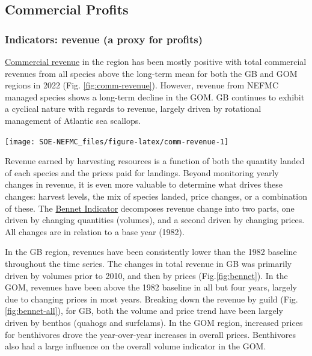 \documentclass[
  10pt,
]{article}
\let\origfigure\figure
\let\endorigfigure\endfigure
\renewenvironment{figure}[1][2] {
    \expandafter\origfigure\expandafter[H]
} {
    \endorigfigure
}
\begin{document}
\newpage

\hypertarget{commercial-profits}{%
\subsection{Commercial Profits}\label{commercial-profits}}

\hypertarget{indicators-revenue-a-proxy-for-profits}{%
\subsubsection{Indicators: revenue (a proxy for profits)}\label{indicators-revenue-a-proxy-for-profits}}

\href{https://noaa-edab.github.io/catalog/comdat.html}{Commercial revenue} in the region has been mostly positive with total commercial revenues from all species above the long-term mean for both the GB and GOM regions in 2022 (Fig. \ref{fig:comm-revenue}). However, revenue from NEFMC managed species shows a long-term decline in the GOM. GB continues to exhibit a cyclical nature with regards to revenue, largely driven by rotational management of Atlantic sea scallops.

\begin{figure}

{\centering \texttt{[image: SOE-NEFMC\_files/figure-latex/comm-revenue-1]} 

}

\caption{Revenue through 2022 for the New England region: total (black) and from NEFMC managed species (red).}\label{fig:comm-revenue}
\end{figure}

Revenue earned by harvesting resources is a function of both the quantity landed of each species and the prices paid for landings. Beyond monitoring yearly changes in revenue, it is even more valuable to determine what drives these changes: harvest levels, the mix of species landed, price changes, or a combination of these. The \href{https://noaa-edab.github.io/catalog/bennet.html}{Bennet Indicator} decomposes revenue change into two parts, one driven by changing quantities (volumes), and a second driven by changing prices. All changes are in relation to a base year (1982).

In the GB region, revenues have been consistently lower than the 1982 baseline throughout the time series. The changes in total revenue in GB was primarily driven by volumes prior to 2010, and then by prices (Fig.\ref{fig:bennet}). In the GOM, revenues have been above the 1982 baseline in all but four years, largely due to changing prices in most years. Breaking down the revenue by guild (Fig. \ref{fig:bennet-all}), for GB, both the volume and price trend have been largely driven by benthos (quahogs and surfclams). In the GOM region, increased prices for benthivores drove the year-over-year increases in overall prices. Benthivores also had a large influence on the overall volume indicator in the GOM.
\end{document}
